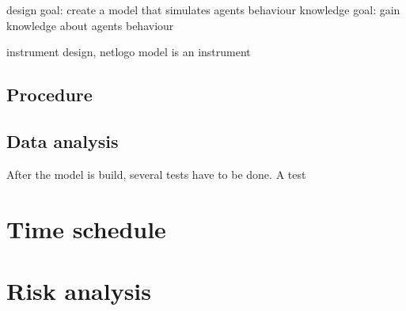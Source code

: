 design goal: create a model that simulates agents behaviour
knowledge goal: gain knowledge about agents behaviour

instrument design, netlogo model is an instrument
\subsection{Procedure}

\subsection{Data analysis}
After the model is build, several tests have to be done.
A test

\section{Time schedule}


\section{Risk analysis}










